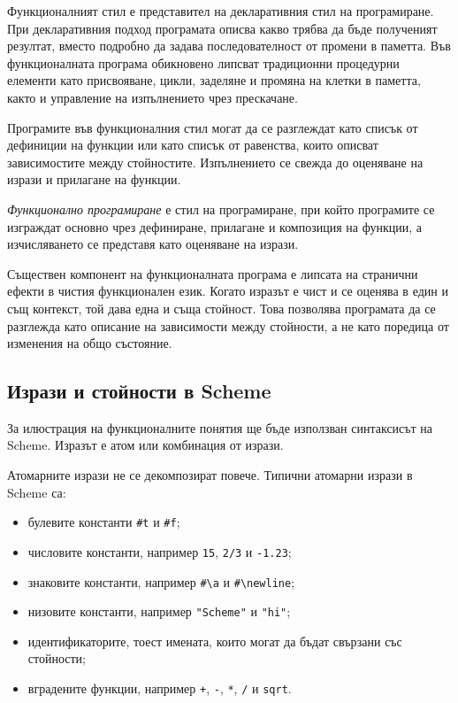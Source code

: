 Функционалният стил е представител на декларативния стил на програмиране. При декларативния подход програмата описва какво трябва да бъде полученият резултат, вместо подробно да задава последователност от промени в паметта. Във функционалната програма обикновено липсват традиционни процедурни елементи като присвояване, цикли, заделяне и промяна на клетки в паметта, както и управление на изпълнението чрез прескачане.

Програмите във функционалния стил могат да се разглеждат като списък от дефиниции на функции или като списък от равенства, които описват зависимостите между стойностите. Изпълнението се свежда до оценяване на изрази и прилагане на функции.

\begin{defn}
\emph{Функционално програмиране} е стил на програмиране, при който програмите се изграждат основно чрез дефиниране, прилагане и композиция на функции, а изчисляването се представя като оценяване на изрази.
\end{defn}

Съществен компонент на функционалната програма е липсата на странични ефекти в чистия функционален език. Когато изразът е чист и се оценява в един и същ контекст, той дава една и съща стойност. Това позволява програмата да се разглежда като описание на зависимости между стойности, а не като поредица от изменения на общо състояние.

\subsection{Изрази и стойности в Scheme}\label{s:19.1.2}

За илюстрация на функционалните понятия ще бъде използван синтаксисът на Scheme. Изразът е атом или комбинация от изрази.

Атомарните изрази не се декомпозират повече. Типични атомарни изрази в Scheme са:

\begin{itemize}
    \item булевите константи \texttt{\#t} и \texttt{\#f};
    \item числовите константи, например \texttt{15}, \texttt{2/3} и \texttt{-1.23};
    \item знаковите константи, например \texttt{\#\textbackslash a} и \texttt{\#\textbackslash newline};
    \item низовите константи, например \texttt{"Scheme"} и \texttt{"hi"};
    \item идентификаторите, тоест имената, които могат да бъдат свързани със стойности;
    \item вградените функции, например \texttt{+}, \texttt{-}, \texttt{*}, \texttt{/} и \texttt{sqrt}.
\end{itemize}

